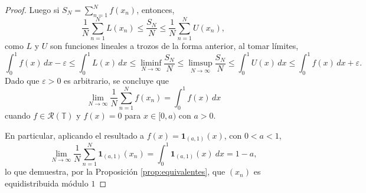 \begin{proof}
    Luego si $S_N = \sum_{n=1}^N f(x_n)$, entonces,
    \[
        \frac{1}{N} \sum_{n=1}^N L(x_n) \leq \frac{S_N}{N} \leq \frac{1}{N} \sum_{n=1}^N U(x_n),
    \]
    como $L$ y $U$ son funciones lineales a trozos de la forma anterior, al tomar límites,
    \[
        \int_0^1 f(x) \, dx - \varepsilon 
        \leq \int_0^1 L(x) \, dx 
        \leq \liminf_{N \to \infty} \frac{S_N}{N} 
        \leq \limsup_{N \to \infty} \frac{S_N}{N} 
        \leq \int_0^1 U(x) \, dx 
        \leq \int_0^1 f(x) \, dx + \varepsilon.
    \]
    Dado que $\varepsilon > 0$ es arbitrario, se concluye que
    \[
        \lim_{N \to \infty} \frac{1}{N} \sum_{n=1}^N f(x_n) = \int_0^1 f(x) \, dx
    \]
    cuando $f\in \mathcal{R}(\mathbb{T})$ y $f(x)=0$ para $x \in [0,a)$ con $a>0$.
    
    En particular, aplicando el resultado a $f(x) = \mathbf{1}_{(a,1)}(x)$, con $0<a<1$,
    \[
        \lim_{N \to \infty} \frac{1}{N} \sum_{n=1}^N \mathbf{1}_{(a,1)}(x_n) = \int_0^1 \mathbf{1}_{(a,1)}(x)\ dx = 1-a,
    \]
    lo que demuestra, por la Proposición \ref{prop:equivalentes}, que $(x_n)$ es equidistribuida módulo $1$
\end{proof}